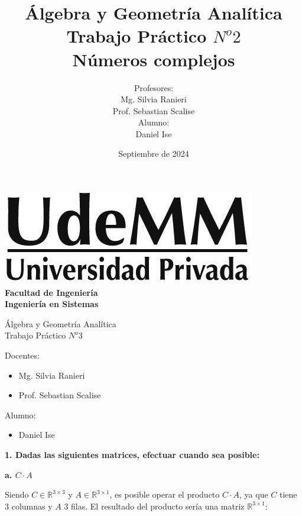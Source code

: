 \documentclass[11pt]{article}
\title{Álgebra y Geometría Analítica\\ Trabajo Práctico $N^{o}2$\\Números complejos}
\author{Profesores:\\Mg. Silvia Ranieri\\Prof. Sebastian Scalise\\Alumno:\\Daniel Ise}
\date{Septiembre de 2024}
\begin{document}
\thispagestyle{empty}

\begin{center}
  \vspace*{.5cm}
  \includegraphics[scale=0.4]{../../img/udemm-logo.png}\\
  \vspace{.2cm}
  \Large
  \textbf{Facultad de Ingeniería}\\
  \textbf{Ingeniería en Sistemas}\\
  \vspace{2cm}

  \Huge
  Álgebra y Geometría Analítica\\
  Trabajo Práctico \(N^{o} 3\)
  \vfill

  \raggedright
  \Large
  Docentes:
  \begin{itemize}
    \item[] Mg. Silvia Ranieri\\
    \item[] Prof. Sebastian Scalise\\
  \end{itemize}
  Alumno:
  \begin{itemize}
    \item[] Daniel Ise
  \end{itemize}
  \vspace{1cm}

\end{center}

\pagebreak

\textbf{1. Dadas las siguientes matrices, efectuar cuando sea posible:}

\textbf{a. \(C \cdot A\)}

Siendo \(C \in \mathbb{R}^{3 \times 3}\)
y \(A \in \mathbb{R}^{3 \times 1}\),
es posible operar el producto \(C \cdot A\),
ya que \(C\) tiene 3 columnas y \(A\) 3 filas.
El resultado del producto sería una matriz \(\mathbb{R}^{3 \times 1}\):
\end{document}
